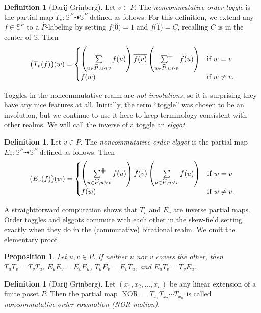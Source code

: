 \documentclass[10pt]{amsart}
\newtheorem{prop}[theo]{Proposition}
\theoremstyle{definition}
\newtheorem{defi}[theo]{Definition}
\newcommand{\defn}[1]{\emph{#1}}
\newcommand{\bigsig}{{\sum}}
\DeclareMathOperator*{\sumpar}{\bigsig^{\ \mathclap{\|}\mathclap{\rule[1.3pt]{6pt}{0.4pt}}}\:}
\newcommand{\bbs}{\mathbb{S}}
\newcommand{\dra}{\dashrightarrow}
\DeclareMathOperator{\NOR}{NOR}
\begin{document}
\begin{defi}[Darij Grinberg]
Let $v\in P$. The \defn{noncommutative order toggle} is the partial map $T_v:\bbs^P\dra
\bbs^P$ defined as follows. For this definition, we extend any $f\in\bbs^P$ to a
$\widehat{P}$-labeling by setting $f\big(\widehat{0}\big)=1$ and $f\big( \widehat{1}
\big) = C$, recalling $C$ is in the center of $\bbs$. Then 
\[
\big(T_v(f)\big)(w) = \begin{cases}
\left(\sum\limits_{u\in\widehat{P},u\lessdot v}f(u)\right)
\overline{f(v)} \left(\sumpar\limits_{u\in\widehat{P},u\gtrdot v}f(u)\right)
 &\text{if $w=v$}\\[4pt]
f(w) &\text{if $w\not=v$}.
\end{cases}
\]
\end{defi}

Toggles in the noncommutative realm are \defn{not involutions}, so it is surprising they have any nice features at all. 
Initially, the term ``toggle'' was chosen
to be an involution, but we continue to use it here to keep terminology consistent with other realms.
We will call the inverse of a toggle an \defn{elggot}.

\begin{defi}
Let $v\in P$. The \defn{noncommutative order elggot} is the partial map $E_v:\bbs^P\dra
\bbs^P$ defined as follows.
Then 
\[
\big(E_v(f)\big)(w) = \begin{cases}
\left(\sumpar\limits_{u\in\widehat{P},u\gtrdot v}f(u)\right)
\overline{f(v)} \left(\sum\limits_{u\in\widehat{P},u\lessdot v}f(u)\right)
 &\text{if $w=v$}\\[4pt]
f(w) &\text{if $w\not=v$}.
\end{cases}
\]
\end{defi}
A straightforward computation shows that $T_{v}$ and $E_{v}$ are inverse partial
maps. 
Order toggles and elggots commute with each other in the skew-field setting exactly when they do 
in the (commutative) birational realm. We omit the elementary proof.

\begin{prop}
Let $u,v\in P$. If neither $u$ nor $v$ covers the other, then
$T_uT_v=T_vT_u$, $E_uE_v=E_vE_u$, $T_uE_v=E_vT_u$, and
$E_uT_v=T_vE_u$.
\end{prop}

\begin{defi}[Darij Grinberg]
Let $(x_1,x_2,\dots,x_n)$ be any linear extension of a finite poset $P$. Then the partial
map $\NOR=T_{x_1} T_{x_2} \cdots T_{x_n}$ is called \defn{noncommutative order rowmotion
(NOR-motion)}. 
\end{defi}
\end{document}
